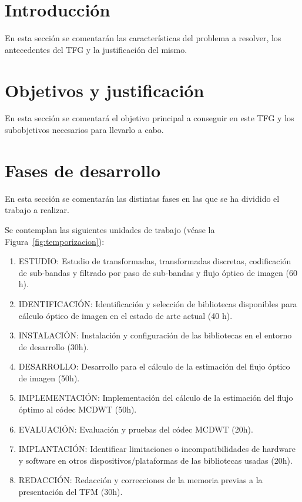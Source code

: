 \documentclass[titlepage, 12pt, a4paper, oneside]{article}
\begin{document}
\normalsize

\section{Introducción}
\cite{einstein1922kosmologische}
En esta sección se comentarán las características del problema a resolver, los antecedentes del TFG y la justificación del mismo.

\section{Objetivos y justificación}
En esta sección se comentará el objetivo principal a conseguir en este TFG y los subobjetivos necesarios para llevarlo a cabo.

\section{Fases de desarrollo}
En esta sección se comentarán las distintas fases en las que se ha dividido el trabajo a realizar.

Se contemplan las siguientes unidades de trabajo (véase la Figura~\ref{fig:temporizacion}):
\begin{enumerate}
  \item {ESTUDIO:} Estudio de transformadas, transformadas discretas,
    codificación de sub-bandas y filtrado por paso de sub-bandas y
    flujo óptico de imagen (60 h).
  \item {IDENTIFICACIÓN}: Identificación y selección de bibliotecas disponibles para
    cálculo óptico de imagen en el estado de arte actual (40 h).
  \item {INSTALACIÓN}: Instalación y configuración de las bibliotecas en el entorno
    de desarrollo (30h).
  \item {DESARROLLO}: Desarrollo para el cálculo de la estimación del flujo óptico
    de imagen (50h).
  \item {IMPLEMENTACIÓN}: Implementación del cálculo de la estimación del flujo óptimo
    al códec MCDWT (50h).
  \item {EVALUACIÓN}: Evaluación y pruebas del códec MCDWT (20h).
  \item {IMPLANTACIÓN}: Identificar limitaciones o incompatibilidades de hardware y
    software en otros dispositivos/plataformas de las bibliotecas
    usadas (20h).
  \item {REDACCIÓN}: Redacción y correcciones de la memoria previas a la
    presentación del TFM (30h).
\end{enumerate}
\end{document}
